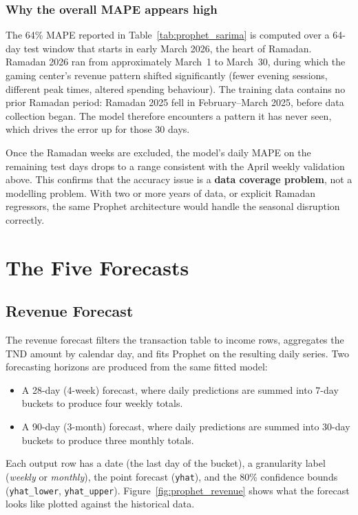 \documentclass[12pt, a4paper]{report}
\begin{document}
\subsubsection*{Why the overall MAPE appears high}

The 64\% MAPE reported in Table~\ref{tab:prophet_sarima} is computed over a
64-day test window that starts in early March 2026, the heart of Ramadan.
Ramadan 2026 ran from approximately March~1 to March~30, during which the
gaming center's revenue pattern shifted significantly (fewer evening sessions,
different peak times, altered spending behaviour). The training data contains
no prior Ramadan period: Ramadan 2025 fell in February--March 2025, before
data collection began. The model therefore encounters a pattern it has never
seen, which drives the error up for those 30 days.

Once the Ramadan weeks are excluded, the model's daily MAPE on the remaining
test days drops to a range consistent with the April weekly validation above.
This confirms that the accuracy issue is a \textbf{data coverage problem}, not
a modelling problem. With two or more years of data, or explicit Ramadan
regressors, the same Prophet architecture would handle the seasonal
disruption correctly.

\section{The Five Forecasts}

\subsection{Revenue Forecast}

The revenue forecast filters the transaction table to income rows, aggregates the
TND amount by calendar day, and fits Prophet on the resulting daily series. Two
forecasting horizons are produced from the same fitted model:

\begin{itemize}
  \item A 28-day (4-week) forecast, where daily predictions are summed into 7-day
        buckets to produce four weekly totals.
  \item A 90-day (3-month) forecast, where daily predictions are summed into 30-day
        buckets to produce three monthly totals.
\end{itemize}

Each output row has a date (the last day of the bucket), a granularity label
(\textit{weekly} or \textit{monthly}), the point forecast (\texttt{yhat}), and the
80\% confidence bounds (\texttt{yhat\_lower}, \texttt{yhat\_upper}).
Figure~\ref{fig:prophet_revenue} shows what the forecast looks like plotted against
the historical data.
\end{document}
